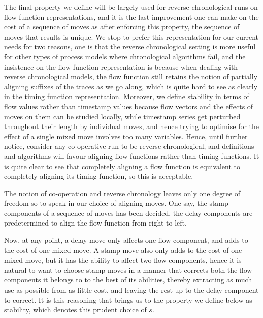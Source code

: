 \documentclass{article}
\theoremstyle{Definition}
\theoremstyle{definition}
\begin{document}
	The final property we define will be largely used for reverse chronological runs on flow function representations, and it is the last improvement one can make on the cost of a sequence of moves as after enforcing this property, the sequence of moves that results is unique. 
	We stop to prefer this representation for our current needs for two reasons, one is that the reverse chronological setting is more useful for other types of process models where chronological algorithms fail, and the insistence on the flow function representation is because when dealing with reverse chronological models, the flow function still retains the notion of partially aligning suffixes of the traces as we go along, which is quite hard to see as clearly in the timing function representation. 
	Moreover, we define stability in terms of flow values rather than timestamp values because flow vectors and the effects of moves on them can be studied locally, while timestamp series get perturbed throughout their length by individual moves, and hence trying to optimise for the effect of a single mixed move involves too many variables. 
	Hence, until further notice, consider any co-operative run to be reverse chronological, and definitions and algorithms will favour aligning flow functions rather than timing functions. 
	It is quite clear to see that completely aligning a flow function is equivalent to completely aligning its timing function, so this is acceptable. 
	
	The notion of co-operation and reverse chronology leaves only one degree of freedom so to speak in our choice of aligning moves. One say, the stamp components of a sequence of moves has been decided, the delay components are predetermined to align the flow function from right to left. 
	
	Now, at any point, a delay move only affects one flow component, and adds to the cost of one mixed move.
	A stamp move also only adds to the cost of one mixed move, but it has the ability to affect two flow components, hence it is natural to want to choose stamp moves in a manner that corrects both the flow components it belongs to to the best of its abilities, thereby extracting as much use as possible from as little cost, and leaving the rest up to the delay component to correct. 
	It is this reasoning that brings us to the property we define below as stability, which denotes this prudent choice of $s$. 
\end{document}

